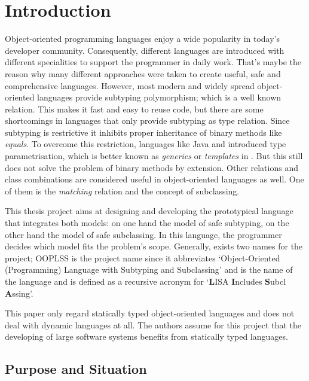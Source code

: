 \chapter{Introduction}
Object-oriented programming languages enjoy a wide popularity in
today's developer community. Consequently, different languages are
introduced with different specialities to support the programmer in
daily work. That's maybe the reason why many different approaches were
taken to create useful, safe and comprehensive languages. However, most
modern and widely spread object-oriented languages provide subtyping
polymorphism; which is a well known relation. This makes it fast and
easy to reuse code, but there are some shortcomings in languages that
only provide subtyping as type relation. Since subtyping is restrictive
it inhibits proper inheritance of binary methods like \emph{equals}. To
overcome this restriction, languages like Java and \cs introduced
type parametrisation, which is better known as \emph{generics} or
\emph{templates} in \cpp. But this still does not solve the problem of
binary methods by extension. Other relations and class combinations are
considered useful in object-oriented languages as well. One of them is
the \emph{matching} relation and the concept of subclassing.

This thesis project aims at designing and developing the
prototypical language \ooplss that integrates both models: on one
hand the model of safe subtyping, on the other hand the model of
safe subclassing. In this language, the programmer decides which
model fits the problem's scope. Generally, exists two names for the
project; OOPLSS is the project name since it
abbreviates `Object-Oriented (Programming) Language with Subtyping and
Subclassing' and \ooplss is the name of the language and is defined
as a recursive acronym for `{\bf L}ISA {\bf I}ncludes {\bf S}ubcl{\bf
A}ssing'.

This paper only regard statically typed object-oriented languages and does
not deal with dynamic languages at all. The authors assume for this project
that the developing of large software systems benefits from statically
typed languages.

\section{Purpose and Situation}
